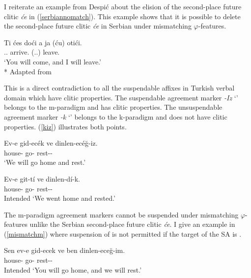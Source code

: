 I reiterate an example from Despi\'c about the elision of the second-place future clitic \textit{\'{c}e} in (\ref{serbiannomatch}). This example shows that it is possible to delete the second-place future clitic \textit{\'ce} in Serbian under mismatching $\varphi$-features. 

\begin{exe}
    \ex \label{serbiannomatch}
    \begin{xlist}
        \ex \gll Ti \'{c}es do\'{c}i a ja (\'{c}u) oti\'{c}i. \\ 
        {\Ssg} {\Aux}.{\Ssg}.{\Fut} arrive.{\Inf} {\And} {\Fsg} ({\Aux}.{\Fsg}.{\Fut}) leave.{\Inf} \\
        \glt `You will come, and I will leave.'\\*
        \hfill Adapted from \citet{despic2017suspended}
    \end{xlist}
\end{exe}

This is a direct contradiction to all the suspendable affixes in Turkish verbal domain which have clitic properties. The suspendable agreement marker \textit{-Iz} `{\Fpl}' belongs to the m-paradigm and has clitic properties. The unsuspendable agreement marker \textit{-k} `{\Fpl}' belongs to the k-paradigm and does not have clitic properties. (\ref{kiz}) illustrates both points.

\begin{exe}
    \ex \label{kiz} 
    \begin{xlist}
        \ex \gll Ev-e gid-ec\'{e}k ve dinlen-ec\'{e}ğ-iz. \\ 
        house-{\Dat} go-{\Fut} {\And} rest-{\Fut}-{\Fpl} \\
        \glt `We will go home and rest.'
        
        \ex \gll *Ev-e git-t\'i ve dinlen-d\'i-k. \\ 
        house-{\Dat} go-{\Pst} {\And} rest-{\Pst}-{\Fpl} \\
        \glt Intended `We went home and rested.'
    \end{xlist}
\end{exe}

The m-paradigm agreement markers cannot be suspended under mismatching $\varphi$-features unlike the Serbian second-place future clitic \textit{\'ce}. I give an example in (\ref{mismatchm}) where suspension of {\Ssg} is not permitted if the target of the SA is {\Fsg}.

\begin{exe}
    \ex \label{mismatchm}
    \gll *Sen ev-e gid-ecek ve ben dinlen-eceğ-im. \\ 
    {\Ssg} house-{\Dat} go-{\Fut} {\And} {\Fsg} rest-{\Fut}-{\Fsg} \\
    \glt Intended `You will go home, and we will rest.'
\end{exe}


